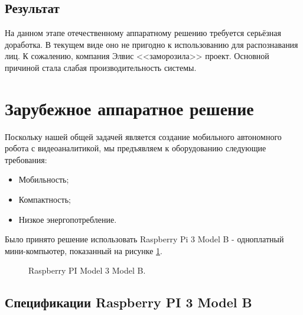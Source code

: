 \documentclass[14pt,a4paper]{scrartcl}
\begin{document}
	\subsection{Результат}
	
		На данном этапе отечественному аппаратному решению требуется серьёзная доработка. В текущем виде оно не пригодно к использованию для распознавания лиц. К сожалению, компания Элвис <<заморозила>> проект. Основной причиной стала слабая производительность системы.

\section{Зарубежное аппаратное решение}

	Поскольку нашей общей задачей является создание мобильного автономного робота с видеоаналитикой, мы предъявляем к оборудованию следующие требования:
	\begin{itemize}
		\item Мобильность;
		\item Компактность;
		\item Низкое энергопотребление.
	\end{itemize}
	
	Было принято решение использовать Raspberry Pi 3 Model B - одноплатный мини-компьютер, показанный на рисунке \ref{fig:PI1}.
	
	\begin{figure}[h]
		\caption{Raspberry PI Model 3 Model B.}
		\label{fig:PI1}
	\end{figure}

	\subsection{Спецификации Raspberry PI 3 Model B}
	
\end{document}
